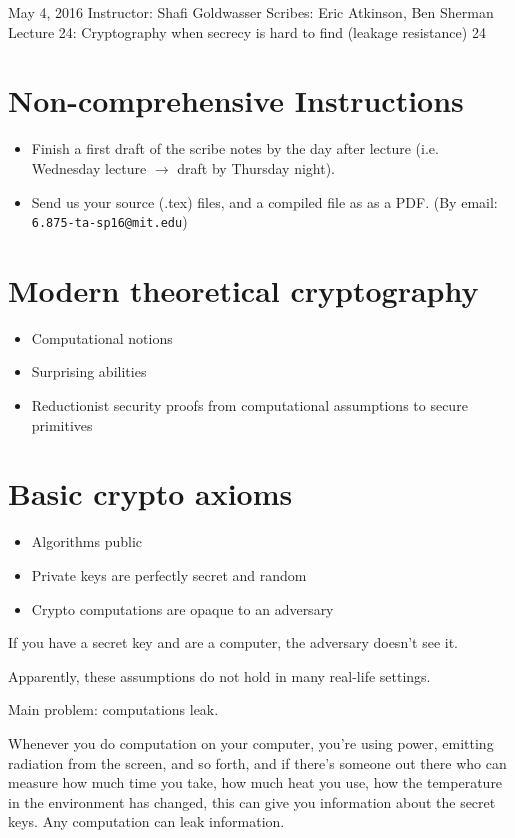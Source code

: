 \documentclass[10pt]{article}
\newcommand{\scribes}{Eric Atkinson, Ben Sherman}
\newcommand{\lecnumber}{24}
\newcommand{\lectitle}{Cryptography when secrecy is hard to find (leakage resistance)}
\newcommand{\thedate}{May 4, 2016}
\begin{document}


{\thedate}
{Instructor: Shafi Goldwasser}
{Scribes: \scribes}
{Lecture \lecnumber: \lectitle}
{\lecnumber}

\section{Non-comprehensive Instructions}
\begin{itemize}
	\item Finish a first draft of the scribe notes by the day after lecture (i.e. Wednesday lecture $\rightarrow$ draft by Thursday night).
	\item Send us your source (.tex) files, and a compiled file as as a PDF. (By email: {\tt 6.875-ta-sp16@mit.edu})
\end{itemize}

\section{Modern theoretical cryptography}

\begin{itemize}
\item Computational notions
\item Surprising abilities
\item Reductionist security proofs from computational assumptions to secure primitives
\end{itemize}

\section{Basic crypto axioms}
\begin{itemize}
\item Algorithms public
\item Private keys are perfectly secret and random
\item Crypto computations are opaque to an adversary
\end{itemize}

If you have a secret key and are a computer, the adversary doesn't see it.

Apparently, these assumptions do not hold in many real-life settings.

Main problem: computations leak.

Whenever you do computation on your computer, you're using power, emitting radiation from the screen, and so forth, and if there's someone out there who can measure how much time you take, how much heat you use, how the temperature in the environment has changed, this can give you information about the secret keys. Any computation can leak information.
\end{document}
